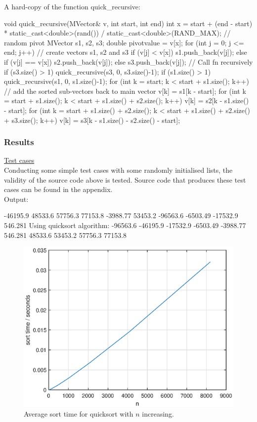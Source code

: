 \documentclass[a4paper, 12pt]{article}
\begin{document}
A hard-copy of the function quick{\_}recursive:
\begin{spverbatim}
void quick_recursive(MVector& v, int start, int end)
{
	int x = start + (end - start) * static_cast<double>(rand()) / static_cast<double>(RAND_MAX); // random pivot
	MVector s1, s2, s3;
	double pivotvalue = v[x];
	for (int j = 0; j <= end; j++) // create vectors s1, s2 and s3
	{
		if (v[j] < v[x]) { s1.push_back(v[j]); }
		else if (v[j] == v[x]) { s2.push_back(v[j]); }
		else { s3.push_back(v[j]);}
	}
	// Call fn recursively
	if (s3.size() > 1)
	{
		quick_recursive(s3, 0, s3.size()-1);
	}
	if (s1.size() > 1)
	{
		quick_recursive(s1, 0, s1.size()-1);
	}
	for (int k = start; k < start + s1.size(); k++) // add the sorted sub-vectors back to main vector
	{
		v[k] = s1[k - start];
	}
	for (int k = start + s1.size(); k < start + s1.size() + s2.size(); k++)
	{
		v[k] = s2[k - s1.size() - start];
	}
	for (int k = start + s1.size() + s2.size(); k < start + s1.size() + s2.size() + s3.size(); k++)
	{
		v[k] = s3[k - s1.size() - s2.size() - start];
	}
}
\end{spverbatim}

\subsubsection{Results}

\underline{Test cases}\\

Conducting some simple test cases with some randomly initialised lists, the validity of the source code above is tested. Source code that produces these test cases can be found in the appendix.\\ 
Output:
\begin{spverbatim}
-46195.9 48533.6 57756.3 77153.8 -3988.77 53453.2 -96563.6 -6503.49 -17532.9 546.281
 Using quicksort algorithm:
-96563.6 -46195.9 -17532.9 -6503.49 -3988.77 546.281 48533.6 53453.2 57756.3 77153.8
\end{spverbatim}
\begin{figure}[H]
\centering
\includegraphics[scale = 0.75]{Quicksort_average_time}
\caption{Average sort time for quicksort with $n$ increasing.}
\end{figure}
\end{document}
